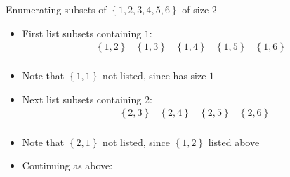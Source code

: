 \documentclass[handout]{beamer}
\theoremstyle{definition}
\begin{document}
\begin{frame}{Enumerating subsets of $\left\{1,2,3,4,5,6\right\}$ of size $2$}
\begin{itemize}
\item First list subsets containing $1$:
\[\begin{array}{ccccc}
\left\{1,2\right\}&\left\{1,3\right\}&\left\{1,4\right\}&\left\{1,5\right\}
  &\left\{1,6\right\}\\
\end{array}\]
\item Note that $\left\{1,1\right\}$ not listed, since has size $1$
\item Next list subsets containing $2$:
\[\begin{array}{ccccc}
&\left\{2,3\right\}&\left\{2,4\right\}&\left\{2,5\right\}&\left\{2,6\right\}\\
\end{array}\]
\item Note that $\left\{2,1\right\}$ not listed, since $\left\{1,2\right\}$
listed above
\item Continuing as above:
\end{itemize}
\end{frame}
\end{document}
